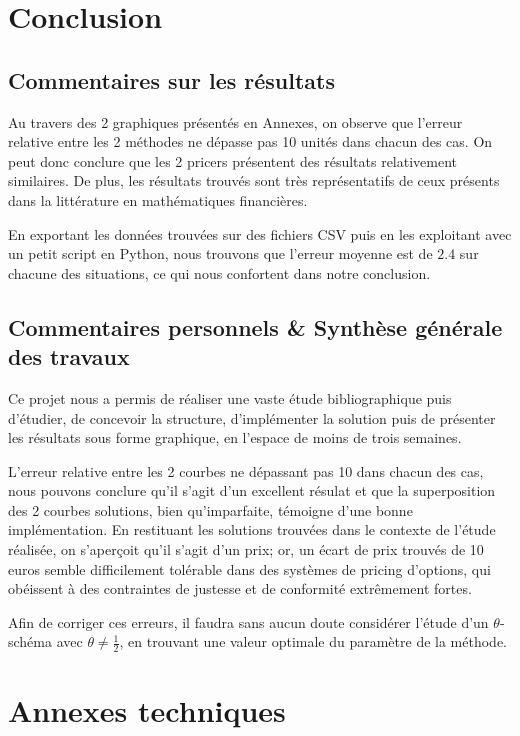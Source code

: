 \documentclass[11pt,a4paper]{article}
\theoremstyle{plain}
\begin{document}
\newpage


\section{Conclusion}
\subsection{Commentaires sur les résultats}
Au travers des 2 graphiques présentés en Annexes, on observe que l'erreur relative entre les 2 méthodes ne dépasse pas 10 unités dans chacun des cas.
On peut donc conclure que les 2 pricers présentent des résultats relativement similaires. De plus, les résultats trouvés sont très représentatifs de ceux présents dans la littérature en mathématiques financières.

En exportant les données trouvées sur des fichiers CSV puis en les exploitant avec un petit script en Python, nous trouvons que l'erreur moyenne est de $2.4$ sur chacune des situations, ce qui nous confortent dans notre conclusion.

\subsection{Commentaires personnels \& Synthèse générale des travaux}
Ce projet nous a permis de réaliser une vaste étude bibliographique puis d'étudier, de concevoir la structure, d'implémenter la solution puis de présenter les résultats sous forme graphique, en l'espace de moins de trois semaines.


L'erreur relative entre les 2 courbes ne dépassant pas 10 dans chacun des cas, nous pouvons conclure qu'il s'agit d'un excellent résulat et que la superposition des 2 courbes solutions, bien qu'imparfaite, témoigne d'une bonne implémentation. En restituant les solutions trouvées dans le contexte de l'étude réalisée, on s'aperçoit qu'il s'agit d'un prix; or, un écart de prix trouvés de 10 euros semble difficilement tolérable dans des systèmes de pricing d'options, qui obéissent à des contraintes de justesse et de conformité extrêmement fortes.

Afin de corriger ces erreurs, il faudra sans aucun doute considérer l'étude d'un $\theta$-schéma avec $\theta \neq \frac{1}{2}$, en trouvant une valeur optimale du paramètre de la méthode.

\section{Annexes techniques}
\end{document}
